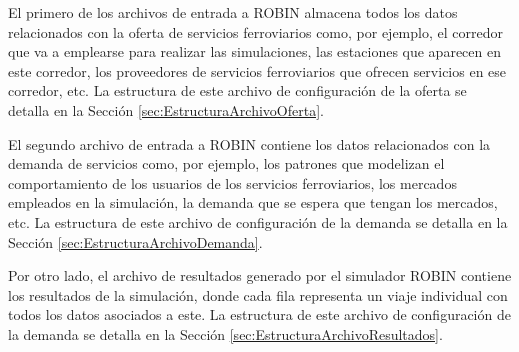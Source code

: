 
El primero de los archivos de entrada a \acrshort{ROBIN} almacena todos los datos relacionados con la oferta de servicios ferroviarios como, por ejemplo, el corredor que va a emplearse para realizar las simulaciones, las estaciones que aparecen en este corredor, los proveedores de servicios ferroviarios que ofrecen servicios en ese corredor, etc. La estructura de este archivo de configuración de la oferta se detalla en la Sección \ref{sec:EstructuraArchivoOferta}.

El segundo archivo de entrada a \acrshort{ROBIN} contiene los datos relacionados con la demanda de servicios como, por ejemplo, los patrones que modelizan el comportamiento de los usuarios de los servicios ferroviarios, los mercados empleados en la simulación, la demanda que se espera que tengan los mercados, etc. La estructura de este archivo de configuración de la demanda se detalla en la Sección \ref{sec:EstructuraArchivoDemanda}. 

Por otro lado, el archivo de resultados generado por el simulador \acrshort{ROBIN} contiene los resultados de la simulación, donde cada fila representa un viaje individual con todos los datos asociados a este. La estructura de este archivo de configuración de la demanda se detalla en la Sección \ref{sec:EstructuraArchivoResultados}.




